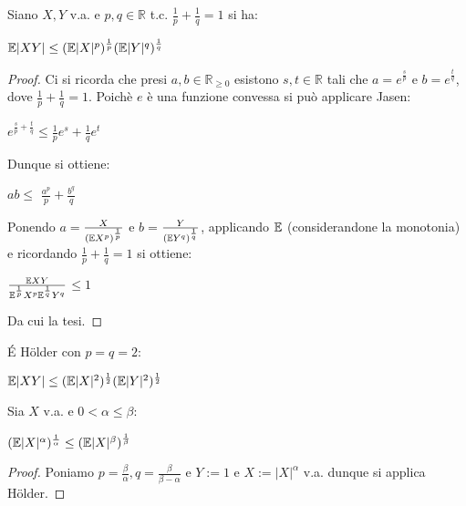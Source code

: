 \begin{proposition}
Siano $X,Y$ v.a. e $p,q\in\mathbb{R}$ t.c. $\frac{1}{p}+\frac{1}{q}=1$ si ha:
\begin{center}
    $\mathbb{E} |XY|\leq(\mathbb{E}|X|^p)^{\frac{1}{p}}(\mathbb{E}|Y|^q)^{\frac{1}{q}}$
\end{center}
\vspace{5px}
\begin{proof}
Ci si ricorda che presi $a,b\in\mathbb{R}_{\geq0}$ esistono $s,t\in\mathbb{R}$ tali che $a=e^{\frac{s}{p}}$ e $b=e^{\frac{t}{q}}$, dove $\frac{1}{p}+\frac{1}{q}=1$. Poichè $e$ è una funzione convessa si può applicare Jasen:
\begin{center}
    $e^{\frac{s}{p}+\frac{t}{q}}\leq \frac{1}{p}e^s+\frac{1}{q}e^t$
\end{center}
Dunque si ottiene:
\begin{center}
    $ab\leq$ {\large $\frac{a^p}{p}+\frac{b^q}{q}$}
\end{center}

Ponendo $a=${\large $\frac{X}{(\mathbb{E} X^p)^{\frac{1}{p}}}$} e $b=${\large $\frac{Y}{(\mathbb{E} Y^q)^{\frac{1}{q}}}$}, applicando $\mathbb{E}$ (considerandone la monotonia) e ricordando $\frac{1}{p}+\frac{1}{q}=1$ si ottiene:
\begin{center}
    {\large $\frac{\mathbb{E} XY}{\mathbb{E}^{\frac{1}{p}} X^p\mathbb{E}^{\frac{1}{q}} Y^q}$}$\leq 1$
\end{center}
Da cui la tesi.
\end{proof}
\end{proposition}

\vspace{5px}

\begin{proposition} \label{CSINEQ}
\'E H\"older con $p=q=2$:
\begin{center}
    $\mathbb{E} |XY|\leq(\mathbb{E} |X|^2)^{\frac{1}{2}}(\mathbb{E} |Y|^2)^{\frac{1}{2}}$
\end{center}
\end{proposition}



\begin{proposition}
Sia $X$ v.a. e $0<\alpha\leq\beta$:
\begin{center}
    $(\mathbb{E} |X|^{\alpha})^{\frac{1}{\alpha}}\leq(\mathbb{E} |X|^{\beta})^{\frac{1}{\beta}}$
\end{center}
\vspace{5px}
\begin{proof}
Poniamo $p=\frac{\beta}{\alpha},q=\frac{\beta}{\beta-\alpha}$ e $Y:=1$ e $X:=|X|^{\alpha}$ v.a. dunque si applica H\"older.
\end{proof}
\end{proposition}

